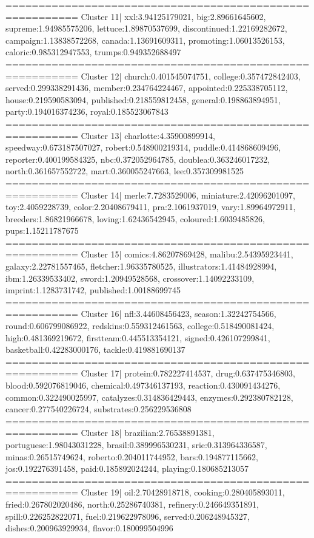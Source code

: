 ========================================================= 
Cluster 11| xxl:3.94125179021, big:2.89661645602, supreme:1.94985575206, lettuce:1.89870537699, discontinued:1.22169282672, campaign:1.13838572268, canada:1.13691609311, promoting:1.06013526153, caloric:0.985312947553, trumps:0.949352688497
========================================================= 
Cluster 12| church:0.401545074751, college:0.357472842403, served:0.299338291436, member:0.234764224467, appointed:0.225338705112, house:0.219590583094, published:0.218559812458, general:0.198863894951, party:0.194016374236, royal:0.185523067843
========================================================= 
Cluster 13| charlotte:4.35900899914, speedway:0.673187507027, robert:0.548900219314, puddle:0.414868609496, reporter:0.400199584325, nbc:0.372052964785, doublea:0.363246017232, north:0.361657552722, mart:0.360055247663, lee:0.357309981525
========================================================= 
Cluster 14| merle:7.7283529006, miniature:2.42096201097, toy:2.4059228739, color:2.20408679411, pra:2.1061937019, vary:1.89964972911, breeders:1.86821966678, loving:1.62436542945, coloured:1.6039485826, pups:1.15211787675
========================================================= 
Cluster 15| comics:4.86207869428, malibu:2.54395923441, galaxy:2.22781557465, fletcher:1.96335780525, illustrators:1.41484928994, ibm:1.26339533402, sword:1.20949528568, crossover:1.14092233109, imprint:1.1283731742, published:1.00188699745
========================================================= 
Cluster 16| nfl:3.44608456423, season:1.32242754566, round:0.606799086922, redskins:0.559312461563, college:0.518490081424, high:0.481369219672, firstteam:0.445513354121, signed:0.426107299841, basketball:0.42283000176, tackle:0.419881690137
========================================================= 
Cluster 17| protein:0.782227414537, drug:0.637475346803, blood:0.592076819046, chemical:0.497346137193, reaction:0.430091434276, common:0.322490025997, catalyzes:0.314836429443, enzymes:0.292380782128, cancer:0.277540226724, substrates:0.256229536808
========================================================= 
Cluster 18| brazilian:2.76538891381, portuguese:1.98043031228, brasil:0.389996530231, srie:0.313964336587, minas:0.26515749624, roberto:0.204011744952, bars:0.194877115662, jos:0.192276391458, paid:0.185892024244, playing:0.180685213057
========================================================= 
Cluster 19| oil:2.70428918718, cooking:0.280405893011, fried:0.267802020486, north:0.25286740381, refinery:0.246649351891, spill:0.226252822071, fuel:0.219622978096, served:0.206248945327, dishes:0.200963929934, flavor:0.180099504996
